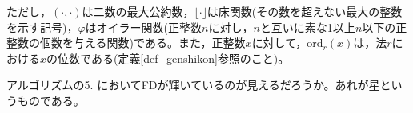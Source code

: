 ただし，$(\cdot ,\cdot)$は二数の最大公約数，$\lfloor\cdot\rfloor$は床関数(その数を超えない最大の整数を示す記号)，$\varphi$はオイラー関数(正整数$n$に対し，$n$と互いに素な1以上$n$以下の正整数の個数を与える関数)である。また，正整数$x$に対して，$\mathrm{ord}_r(x)$は，法$r$における$x$の位数である(定義\ref{def_genshikon}参照のこと)。

アルゴリズムの5. において\textsf{FD}が輝いているのが見えるだろうか。あれが星というものである。



